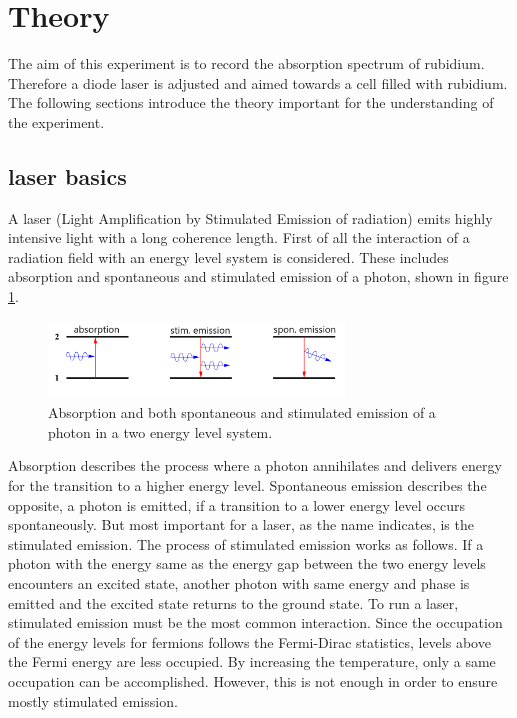 \section{Theory}
\label{sec:theory}
The aim of this experiment is to record the absorption spectrum
of rubidium. Therefore a diode laser is adjusted and aimed towards a cell
filled with rubidium.
The following sections introduce the theory
important for the understanding of the experiment.

\subsection{laser basics}
\label{subsec:laser}
A laser (Light Amplification by Stimulated Emission of radiation)
emits highly intensive light with a long coherence length.
First of all the interaction of a radiation field with
an energy level system is considered. These includes
absorption and spontaneous and stimulated emission
of a photon, shown in figure \ref{fig:ab_em}.
\begin{figure}
\centering
\includegraphics[width=0.7\textwidth]{ab_und_emiss.png}
\caption{Absorption and both spontaneous and stimulated emission of a photon in a two energy level system.
\cite{V61}}
\label{fig:ab_em}
\end{figure}
Absorption describes the process where a photon annihilates and
delivers energy for the transition
to a higher energy level.
Spontaneous emission describes the opposite, a photon is
emitted, if a transition to a lower energy
level occurs spontaneously.
But most important for a laser, as the name indicates,
is the stimulated emission.
The process of stimulated emission works as follows.
If a photon with the energy same as
the energy gap between the two energy levels
encounters an excited state, another photon with
same energy and phase is emitted and the excited state
returns to the ground state.
To run a laser, stimulated emission must be the most common interaction.
Since the occupation of the energy levels for fermions follows
the Fermi-Dirac statistics, %
levels above the Fermi energy are
less occupied. By increasing the temperature, only
a same occupation can be accomplished.
However, this is not enough in order to ensure mostly stimulated emission.
